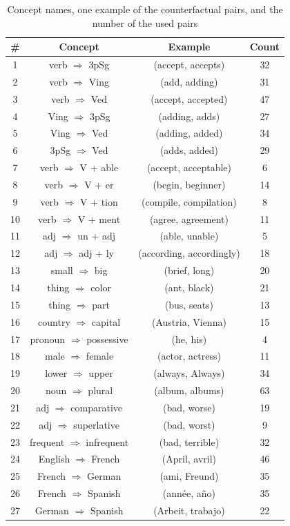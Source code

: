 \documentclass{article}
\theoremstyle{plain}
\theoremstyle{definition}
\theoremstyle{remark}
\begin{document}
\begin{table}[t]
\caption{Concept names, one example of the counterfactual pairs, and the number of the used pairs}
\label{tbl:concept_names}
\vskip 0.15in
\begin{center}
\begin{small}
\begin{tabular}{cccc}
\toprule
\# & Concept & Example & Count \\
\midrule
1 & verb $\Rightarrow$ 3pSg & (accept, accepts) & 32 \\
2 & verb $\Rightarrow$ Ving & (add, adding) & 31 \\
3 & verb $\Rightarrow$ Ved & (accept, accepted) & 47 \\
4 & Ving $\Rightarrow$ 3pSg & (adding, adds) & 27 \\
5 & Ving $\Rightarrow$ Ved & (adding, added) & 34 \\
6 & 3pSg $\Rightarrow$ Ved & (adds, added) & 29 \\
7 & verb $\Rightarrow$ V + able & (accept, acceptable) & 6 \\
8 & verb $\Rightarrow$ V + er & (begin, beginner) & 14 \\
9 & verb $\Rightarrow$ V + tion & (compile, compilation) & 8 \\
10 & verb $\Rightarrow$ V + ment & (agree, agreement) & 11 \\
11 & adj $\Rightarrow$ un + adj & (able, unable) & 5 \\
12 & adj $\Rightarrow$ adj + ly & (according, accordingly) & 18 \\
13 & small $\Rightarrow$ big & (brief, long) & 20 \\
14 & thing $\Rightarrow$ color & (ant, black) & 21 \\
15 & thing $\Rightarrow$ part & (bus, seats) & 13 \\
16 & country $\Rightarrow$ capital & (Austria, Vienna) & 15 \\
17 & pronoun $\Rightarrow$ possessive & (he, his) & 4 \\
18 & male $\Rightarrow$ female & (actor, actress) & 11 \\
19 & lower $\Rightarrow$ upper & (always, Always) & 34 \\
20 & noun $\Rightarrow$ plural & (album, albums) & 63 \\
21 & adj $\Rightarrow$ comparative & (bad, worse) & 19 \\
22 & adj $\Rightarrow$ superlative & (bad, worst) & 9 \\
23 & frequent $\Rightarrow$ infrequent & (bad, terrible) & 32 \\
24 & English $\Rightarrow$ French & (April, avril) & 46 \\
25 & French $\Rightarrow$ German & (ami, Freund) & 35 \\
26 & French $\Rightarrow$ Spanish & (année, año) & 35 \\
27 & German $\Rightarrow$ Spanish & (Arbeit, trabajo) & 22 \\
\bottomrule
\end{tabular}
\end{small}
\end{center}
\vskip -0.1in
\end{table}
\end{document}
